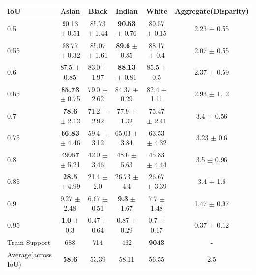 \begin{tabular}{|l|cccc|c|}
\hline
IoU & Asian & Black & Indian & White & Aggregate(Disparity) \\
\hline
0.5 & 90.13 $\pm$ 0.51 & 85.73 $\pm$ 1.44 & \textbf{90.53} $\pm$ 0.76 & 89.57 $\pm$ 0.15 & 2.23 $\pm$ 0.55 \\
0.55 & 88.77 $\pm$ 0.32 & 85.07 $\pm$ 1.61 & \textbf{89.6} $\pm$ 0.85 & 88.17 $\pm$ 0.4 & 2.07 $\pm$ 0.55 \\
0.6 & 87.5 $\pm$ 0.85 & 83.0 $\pm$ 1.97 & \textbf{88.13} $\pm$ 0.81 & 85.5 $\pm$ 0.5 & 2.37 $\pm$ 0.59 \\
0.65 & \textbf{85.73} $\pm$ 0.75 & 79.0 $\pm$ 2.62 & 84.37 $\pm$ 0.29 & 82.4 $\pm$ 1.11 & 2.93 $\pm$ 1.12 \\
0.7 & \textbf{78.6} $\pm$ 2.13 & 71.2 $\pm$ 2.92 & 77.9 $\pm$ 1.32 & 75.47 $\pm$ 2.41 & 3.4 $\pm$ 0.56 \\
0.75 & \textbf{66.83} $\pm$ 4.46 & 59.4 $\pm$ 3.12 & 65.03 $\pm$ 3.84 & 63.53 $\pm$ 4.32 & 3.23 $\pm$ 0.6 \\
0.8 & \textbf{49.67} $\pm$ 5.21 & 42.0 $\pm$ 3.46 & 48.6 $\pm$ 5.63 & 45.83 $\pm$ 4.44 & 3.5 $\pm$ 0.96 \\
0.85 & \textbf{28.5} $\pm$ 4.99 & 21.4 $\pm$ 2.0 & 26.73 $\pm$ 4.4 & 26.67 $\pm$ 3.39 & 3.4 $\pm$ 1.6 \\
0.9 & 9.27 $\pm$ 2.48 & 6.67 $\pm$ 0.51 & \textbf{9.3} $\pm$ 1.67 & 7.7 $\pm$ 1.48 & 1.47 $\pm$ 0.97 \\
0.95 & \textbf{1.0} $\pm$ 0.3 & 0.47 $\pm$ 0.64 & 0.87 $\pm$ 0.29 & 0.7 $\pm$ 0.17 & 0.37 $\pm$ 0.12 \\
\hline
Train Support & 688 & 714 & 432 & \textbf{9043} & - \\
\hline
Average(across IoU) & \textbf{58.6} & 53.39 & 58.11 & 56.55 & 2.5 \\
\hline
\end{tabular}